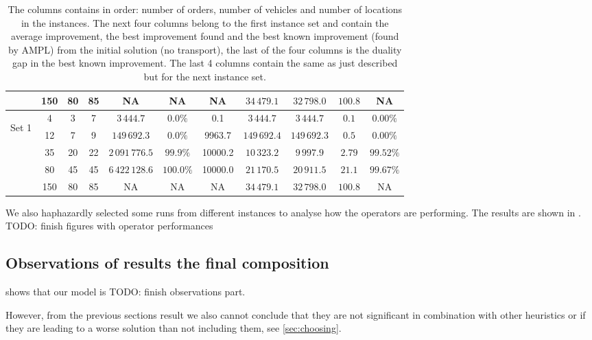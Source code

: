 \documentclass[../main.tex]{subfiles}
\begin{document}
\begin{table}
\begin{adjustbox}{width=0.95\columnwidth,center}
\begin{tabular}{|cccc|ccc|ccc|c|}
                        & 150     & 80    & 85    & NA              & NA            & NA        & $34\,479.1$   & $32\,798.0$  & $100.8$   & NA  \\
            \hline
                \multirow{5}{*}{\begin{sideways} Set 1 \end{sideways}}  
                        & 4       & 3     & 7     & $3\,444.7$      & $0.0\%$       & 0.1       & $3\,444.7$    & $3\,444.7$    & $0.1$        & $0.00\%$  \\
                        & 12      & 7     & 9     & $149\,692.3$    & $0.0\%$       & 9963.7    & $149\,692.4$   & $149\,692.3$  & $0.5$   & $0.00\%$  \\
                        & 35      & 20    & 22    & $2\,091\,776.5$ & $99.9\%$      & 10000.2   & $10\,323.2$   & $9\,997.9$      & $2.79$   & $99.52\%$  \\
                        & 80      & 45    & 45    & $6\,422\,128.6$ & $100.0\%$     & 10000.0   & $21\,170.5$   & $20\,911.5$  & $21.1$   & $99.67\%$  \\
                        & 150     & 80    & 85    & NA              & NA            & NA        & $34\,479.1$   & $32\,798.0$  & $100.8$   & NA  \\
            \hline
            \end{tabular}
    \label{tab:wildComp}
    \end{adjustbox}
    \caption*{The columns contains in order: number of orders, number of vehicles and number of locations in the instances. The next four columns belong to the first instance set and contain the average improvement, the best improvement found and the best known improvement (found by AMPL) from the initial solution (no transport), the last of the four columns is the duality gap in the best known improvement. The last 4 columns contain the same as just described but for the next instance set.}
\end{table}



We also haphazardly selected some runs from different instances to analyse how the operators are performing.
The results are shown in .
TODO: finish figures with operator performances

\subsection{Observations of results  the final composition}
\label{sec:finalObs}
 shows that our model is TODO: finish observations part.

However, from the previous sections result we also cannot conclude that they are not significant in combination with other heuristics or if they are leading to a worse solution than not including them, see \ref{sec:choosing}. 

\biblio                                                         
\end{document}
